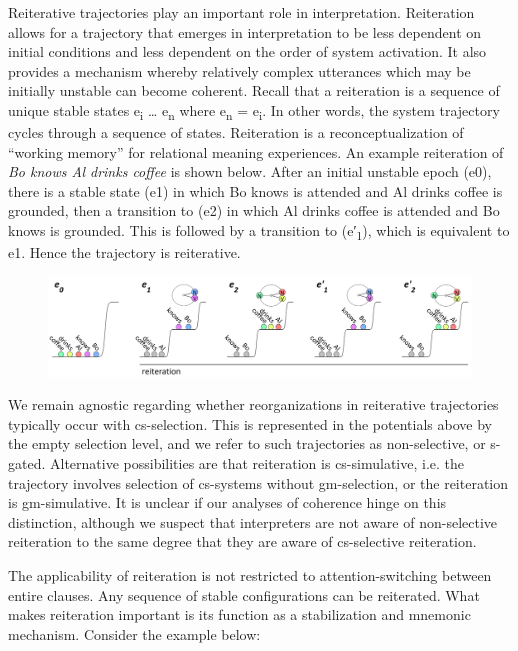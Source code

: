   Reiterative trajectories play an important role in interpretation. Reiteration allows for a trajectory that emerges in interpretation to be less dependent on initial conditions and less dependent on the order of system activation. It also provides a mechanism whereby relatively complex utterances which may be initially unstable can become coherent. Recall that a reiteration is a sequence of unique stable states e\textsubscript{i} … e\textsubscript{n} where e\textsubscript{n} = e\textsubscript{i}. In other words, the system trajectory cycles through a sequence of states. Reiteration is a reconceptualization of “working memory” for relational meaning experiences. An example reiteration of \textit{Bo knows Al drinks coffee} is shown below. After an initial unstable epoch (e0), there is a stable state (e1) in which {\textbar}Bo knows{\textbar} is attended and {\textbar}Al drinks coffee{\textbar} is grounded, then a transition to (e2) in which {\textbar}Al drinks coffee{\textbar} is attended and {\textbar}Bo knows{\textbar} is grounded. This is followed by a transition to (e′\textsubscript{1}), which is equivalent to e1. Hence the trajectory is reiterative.

  
\begin{figure}
\includegraphics[width=\textwidth]{figures/Tilsen-img122.png}
\caption{\missingcaption}
\label{fig:}
\end{figure}
 

  We remain agnostic regarding whether reorganizations in reiterative trajectories typically occur with cs-selection. This is represented in the potentials above by the empty selection level, and we refer to such trajectories as non-selective, or s-gated. Alternative possibilities are that reiteration is cs-simulative, i.e. the trajectory involves selection of cs-systems without gm-selection, or the reiteration is gm-simulative. It is unclear if our analyses of coherence hinge on this distinction, although we suspect that interpreters are not aware of non-selective reiteration to the same degree that they are aware of cs-selective reiteration.  

  The applicability of reiteration is not restricted to attention-switching between entire clauses. Any sequence of stable configurations can be reiterated. What makes reiteration important is its function as a stabilization and mnemonic mechanism. Consider the example below:  

